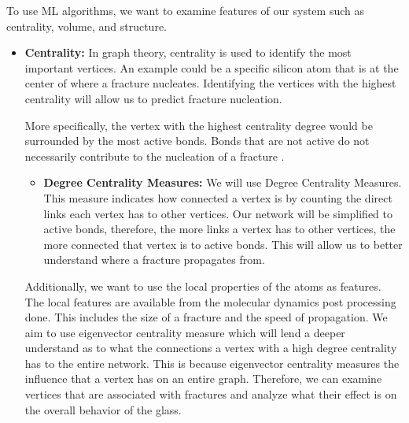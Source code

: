 \begin{itemize}
To use ML algorithms, we want to examine features of our system such as centrality, volume, and structure.

\begin{itemize}
    \item \textbf{Centrality:} In graph theory, centrality is used to identify the most important vertices. An example could be a specific silicon atom that is at the center of where a fracture nucleates. Identifying the vertices with the highest centrality will allow us to predict fracture nucleation.
    
    \bigskip
    
    More specifically, the vertex with the highest centrality degree would be surrounded by the most active bonds. Bonds that are not active do not necessarily contribute to the nucleation of a fracture \cite{valera2018machine}.
    
    \begin{itemize}
        \item \textbf{Degree Centrality Measures:} We will use Degree Centrality Measures. This measure indicates how connected a vertex is by counting the direct links each vertex has to other vertices. Our network will be simplified to active bonds, therefore, the more links a vertex has to other vertices, the more connected that vertex is to active bonds. This will allow us to better understand where a fracture propagates from. 
    \end{itemize}
    
    \bigskip
    
    Additionally, we want to use the local properties of the atoms as features. The local features are available from the molecular dynamics post processing done. 
    This includes the size of a fracture and the speed of propagation. We aim to use eigenvector centrality measure which will lend a deeper understand as to what the connections a vertex with a high degree centrality has to the entire network. This is because eigenvector centrality measures the influence that a vertex has on an entire graph. Therefore, we can examine vertices that are associated with fractures and analyze what their effect is on the overall behavior of the glass.
    

\end{itemize}
\end{itemize}
